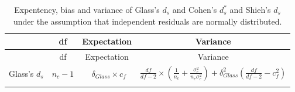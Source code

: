 \documentclass[
  english,
  man,floatsintext]{apa6}
\begin{document}
\newpage
\begin{landscape}

\begin{longtable}[]{@{}lccc@{}}
\caption{Expentency, bias and variance of Glass's \(d_s\) and Cohen's \(d^*_s\) and Shieh's \(d_s\) under the assumption that independent residuals are normally distributed.}\tabularnewline
\toprule
\begin{minipage}[b]{0.10\columnwidth}\raggedright
\strut
\end{minipage} & \begin{minipage}[b]{0.18\columnwidth}\centering
df\strut
\end{minipage} & \begin{minipage}[b]{0.16\columnwidth}\centering
Expectation\strut
\end{minipage} & \begin{minipage}[b]{0.45\columnwidth}\centering
Variance\strut
\end{minipage}\tabularnewline
\midrule
\endfirsthead
\toprule
\begin{minipage}[b]{0.10\columnwidth}\raggedright
\strut
\end{minipage} & \begin{minipage}[b]{0.18\columnwidth}\centering
df\strut
\end{minipage} & \begin{minipage}[b]{0.16\columnwidth}\centering
Expectation\strut
\end{minipage} & \begin{minipage}[b]{0.45\columnwidth}\centering
Variance\strut
\end{minipage}\tabularnewline
\midrule
\endhead
\begin{minipage}[t]{0.10\columnwidth}\raggedright
Glass's \(d_s\)\strut
\end{minipage} & \begin{minipage}[t]{0.18\columnwidth}\centering
\(n_c-1\)\strut
\end{minipage} & \begin{minipage}[t]{0.16\columnwidth}\centering
~\(\delta_{Glass} \times c_f\)\strut
\end{minipage} & \begin{minipage}[t]{0.45\columnwidth}\centering
\(\frac{df}{df-2} \times \left( \frac{1}{n_c} + \frac{\sigma^2_e}{n_e\sigma^2_c}\right) + \delta^2_{Glass} \left( \frac{df}{df-2} - c_f^2 \right)\)\strut
\end{minipage}\tabularnewline
\begin{minipage}[t]{0.10\columnwidth}\raggedright

\end{minipage}
\end{longtable}
\end{landscape}
\end{document}
